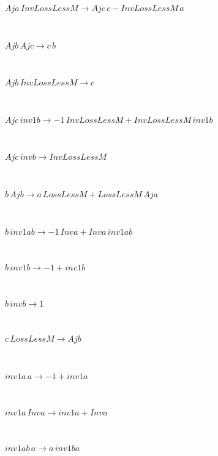 \begin{minipage}{6in}
$
Aja\,
 InvLossLessM\rightarrow Ajc\,
 c - InvLossLessM\,
 a
$
\end{minipage}\medskip \\
\begin{minipage}{6in}
$
Ajb\,
 Ajc\rightarrow c\,
 b
$
\end{minipage}\medskip \\
\begin{minipage}{6in}
$
Ajb\,
 InvLossLessM\rightarrow c
$
\end{minipage}\medskip \\
\begin{minipage}{6in}
$
Ajc\,
 inv1b\rightarrow -1\,
 InvLossLessM + InvLossLessM\,
 inv1b
$
\end{minipage}\medskip \\
\begin{minipage}{6in}
$
Ajc\,
 invb\rightarrow InvLossLessM
$
\end{minipage}\medskip \\
\begin{minipage}{6in}
$
b\,
 Ajb\rightarrow a\,
 LossLessM + LossLessM\,
 Aja
$
\end{minipage}\medskip \\
\begin{minipage}{6in}
$
b\,
 inv1ab\rightarrow -1\,
 Inva + Inva\,
 inv1ab
$
\end{minipage}\medskip \\
\begin{minipage}{6in}
$
b\,
 inv1b\rightarrow -1 + inv1b
$
\end{minipage}\medskip \\
\begin{minipage}{6in}
$
b\,
 invb\rightarrow 1
$
\end{minipage}\medskip \\
\begin{minipage}{6in}
$
c\,
 LossLessM\rightarrow Ajb
$
\end{minipage}\medskip \\
\begin{minipage}{6in}
$
inv1a\,
 a\rightarrow -1 + inv1a
$
\end{minipage}\medskip \\
\begin{minipage}{6in}
$
inv1a\,
 Inva\rightarrow inv1a + Inva
$
\end{minipage}\medskip \\
\begin{minipage}{6in}
$
inv1ab\,
 a\rightarrow a\,
 inv1ba
$
\end{minipage}\medskip \\
